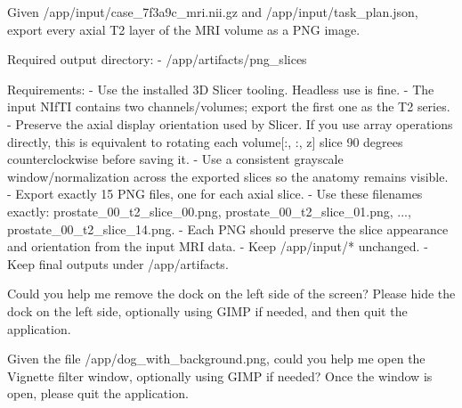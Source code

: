 \documentclass{llmxive}
\begin{document}
\begin{instructionbox}
Given \textasciigrave{}/app/input/case\_7f3a9c\_mri.nii.gz\textasciigrave{} and \textasciigrave{}/app/input/task\_plan.json\textasciigrave{}, export every axial T2 layer of the MRI volume as a PNG image.

Required output directory:
- \textasciigrave{}/app/artifacts/png\_slices\textasciigrave{}

Requirements:
- Use the installed 3D Slicer tooling. Headless use is fine.
- The input NIfTI contains two channels/volumes; export the first one as the T2 series.
- Preserve the axial display orientation used by Slicer. If you use array operations directly, this is equivalent to rotating each \textasciigrave{}volume[:, :, z]\textasciigrave{} slice 90 degrees counterclockwise before saving it.
- Use a consistent grayscale window/normalization across the exported slices so the anatomy remains visible.
- Export exactly 15 PNG files, one for each axial slice.
- Use these filenames exactly: \textasciigrave{}prostate\_00\_t2\_slice\_00.png\textasciigrave{}, \textasciigrave{}prostate\_00\_t2\_slice\_01.png\textasciigrave{}, ..., \textasciigrave{}prostate\_00\_t2\_slice\_14.png\textasciigrave{}.
- Each PNG should preserve the slice appearance and orientation from the input MRI data.
- Keep \textasciigrave{}/app/input/*\textasciigrave{} unchanged.
- Keep final outputs under \textasciigrave{}/app/artifacts\textasciigrave{}.
\end{instructionbox}

\begin{instructionbox}
Could you help me remove the dock on the left side of the screen? Please hide the dock on the left side, optionally using GIMP if needed, and then quit the application.
\end{instructionbox}

\begin{instructionbox}
Given the file \textasciigrave{}/app/dog\_with\_background.png\textasciigrave{}, could you help me open the Vignette filter window, optionally using GIMP if needed? Once the window is open, please quit the application.
\end{instructionbox}
\end{document}

